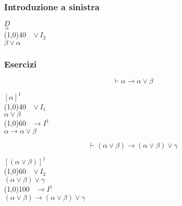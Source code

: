 \documentclass{article}
\theoremstyle{break}
\theoremstyle{break}
\theoremstyle{break}
\theoremstyle{break}
\begin{document}
\subsubsection{Introduzione a sinistra}
\begin{center}
    \( \underset{\alpha}{D} \) \\
    \hspace{0.9cm}\line(1,0){40}\(\;\;\; \vee I_2 \)\\  
    \( \beta \vee \alpha \)
\end{center}


\subsubsection{Esercizi}
\begin{exercise}
    \[
    \vdash \alpha \to \alpha \vee \beta
    \] 
    \begin{center}
        \( [\alpha]^1 \)\\
    \hspace{0.9cm}\line(1,0){40}\(\;\;\; \vee I_1 \)\\  
    \( \alpha \vee \beta \) \\
    \hspace{1cm}\line(1,0){60}\(\;\;\; \to I^1 \)\\  
      \( \alpha \to \alpha \vee \beta \) 
    \end{center}
\end{exercise}

\begin{exercise}[a casa]
    \[
        \vdash (\alpha \vee \beta) \to (\alpha \vee \beta) \vee \gamma
    \] 
    \begin{center}
        \( [(\alpha \vee \beta)]^1 \) \\
        \hspace{0.7cm}\line(1,0){60}\(\;\;\; \vee I_2  \)\\
          \( (\alpha \vee \beta) \vee \gamma \) \\
        \hspace{1cm}\line(1,0){100}\(\;\;\; \to I^1  \)\\
        \( (\alpha \vee \beta) \to (\alpha \vee \beta) \vee \gamma \) 
    \end{center}
\end{exercise}
\end{document}

